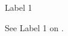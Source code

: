 \documentclass[12pt]{article}
\begin{document}
\thispagestyle{empty}

%

\label{label1}Label 1
\vskip 2in\vfill\break

See Label 1 on \pageref{label1}.
\end{document}
